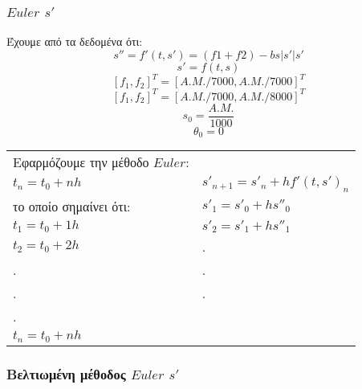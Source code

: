 \documentclass[a4paper]{article}
\begin{document}
        
        \subsubsection*{$Euler$ $s'$}
        Έχουμε από τα δεδομένα ότι:
        \begin{equation}
            s''=f'(t,s')=(f1+f2)-bs|s'|s'
        \end{equation}
        \begin{equation}
            s'=f(t,s)
        \end{equation}
        \[{[f_1,f_2]}^T={[A.M./7000, A.M./7000]}^T\]
        \[{[f_1,f_2]}^T={[A.M./7000, A.M./8000]}^T\]
        \[s_0=\frac{A.M.}{1000}\]
        \[\theta_0=0\]

        
            \begin{tabular}{ll}
                Εφαρμόζουμε την μέθοδο $Euler$:                             &                               \\
                $t_n=t_0+nh$                                                & $s'_{n+1}=s'_n+hf'(t,s')_n$   \\
                το οποίο σημαίνει ότι:                                      & $s'_1=s'_0+hs''_0$            \\
                $t_1=t_0+1h$                                                & $s'_2=s'_1+hs''_1$            \\
                $t_2=t_0+2h$                                                & .                             \\
                .                                                           & .                             \\
                .                                                           & .                             \\
                .                                                           &                               \\
                $t_n=t_0+nh$                                                &                         
            \end{tabular}





        \subsubsection*{Bελτιωμένη μέθοδος $Euler$ $s'$}
\end{document}
